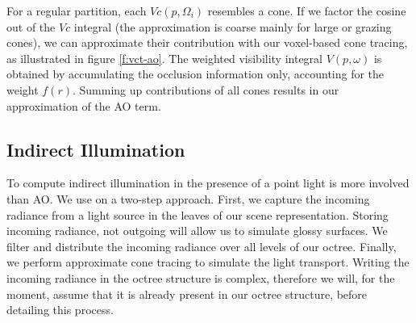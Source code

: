 For a regular partition, each $Vc(p,\Omega_i)$ resembles a cone. If  we factor the cosine out of the $Vc$ integral (the approximation is coarse mainly for large or grazing cones), we can approximate their contribution with our voxel-based cone tracing, as illustrated in figure \ref{f:vct-ao}. The weighted visibility integral $V(p,\omega)$ is obtained by accumulating the occlusion information only, accounting for the weight $f(r)$. Summing up contributions of all cones results in our approximation of the AO term.




\subsection{Indirect Illumination}
To compute indirect illumination in the presence of a point light is more involved than AO. We use on a two-step approach. First, we capture the incoming radiance from a light source in the leaves of our scene representation. Storing incoming radiance, not outgoing will allow us to simulate glossy surfaces. We filter and distribute the incoming radiance over all levels of our octree. Finally, we perform approximate cone tracing to simulate the light transport. Writing the incoming radiance in the octree structure is complex, therefore we will, for the moment, assume that it is already present in our octree structure, before detailing this process.

